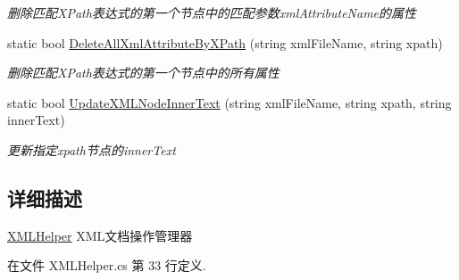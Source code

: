 \begin{DoxyCompactItemize}
\begin{DoxyCompactList}\small\item\em 删除匹配\-X\-Path表达式的第一个节点中的匹配参数xml\-Attribute\-Name的属性 \end{DoxyCompactList}\item 
static bool \hyperlink{class_x_c_l_net_tools_1_1_x_m_l_1_1_x_m_l_helper_a07059a8c89a84c359cc9893c842a263e}{Delete\-All\-Xml\-Attribute\-By\-X\-Path} (string xml\-File\-Name, string xpath)
\begin{DoxyCompactList}\small\item\em 删除匹配\-X\-Path表达式的第一个节点中的所有属性 \end{DoxyCompactList}\item 
static bool \hyperlink{class_x_c_l_net_tools_1_1_x_m_l_1_1_x_m_l_helper_a680dbf5fec70c3e5e30d0f75fedc2d3c}{Update\-X\-M\-L\-Node\-Inner\-Text} (string xml\-File\-Name, string xpath, string inner\-Text)
\begin{DoxyCompactList}\small\item\em 更新指定xpath节点的inner\-Text \end{DoxyCompactList}\end{DoxyCompactItemize}


\subsection{详细描述}
\hyperlink{class_x_c_l_net_tools_1_1_x_m_l_1_1_x_m_l_helper}{X\-M\-L\-Helper} X\-M\-L文档操作管理器 



在文件 X\-M\-L\-Helper.\-cs 第 33 行定义.



